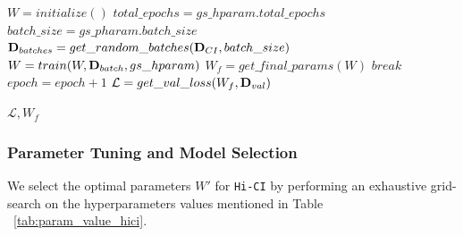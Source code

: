 \documentclass[twoside,11pt]{article}
\begin{document}
\begin{algorithm}
\caption{\texttt{Train$_{Hi-CI}$}}
\label{alg:trainer}
\begin{algorithmic}[1]
\State $W = initialize()$
\State $total\_epochs = gs\_hparam.total\_epochs$
\State $batch\_size = gs\_pharam.batch\_size$
    \State $\mathbf{D}_{batches} = get\_random\_batches(\mathbf{D}_{CI}, batch\_size)$
        \State $W = train(W, \mathbf{D}_{batch}, gs\_hparam)$
    \EndFor
    \State $W_f = get\_final\_params(W)$ 
    \State $break$
    \EndIf
    \State $epoch = epoch +1$
\EndWhile
\State $\mathcal{L} = get\_val\_loss(W_f, \mathbf{D}_{val})$\par%
\Return $\mathcal{L},W_f$
\EndProcedure
\end{algorithmic}
\end{algorithm}

\subsubsection{Parameter Tuning and Model Selection}
We select the optimal parameters $W'$ for \texttt{Hi-CI} by performing an exhaustive grid-search on the hyperparameters values mentioned in Table ~\ref{tab:param_value_hici}.
\end{document}
